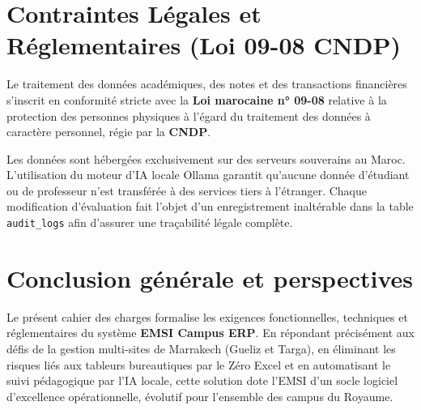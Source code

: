 \documentclass[11pt,a4paper]{report}
\begin{document}
\chapter{Contraintes Légales et Réglementaires (Loi 09-08 CNDP)}

Le traitement des données académiques, des notes et des transactions financières s'inscrit en conformité stricte avec la \textbf{Loi marocaine n° 09-08} relative à la protection des personnes physiques à l'égard du traitement des données à caractère personnel, régie par la \textbf{CNDP}.

Les données sont hébergées exclusivement sur des serveurs souverains au Maroc. L'utilisation du moteur d'IA locale Ollama garantit qu'aucune donnée d'étudiant ou de professeur n'est transférée à des services tiers à l'étranger. Chaque modification d'évaluation fait l'objet d'un enregistrement inaltérable dans la table \texttt{audit\_logs} afin d'assurer une traçabilité légale complète.

\chapter{Conclusion générale et perspectives}

Le présent cahier des charges formalise les exigences fonctionnelles, techniques et réglementaires du système \textbf{EMSI Campus ERP}. En répondant précisément aux défis de la gestion multi-sites de Marrakech (Gueliz et Targa), en éliminant les risques liés aux tableurs bureautiques par le Zéro Excel et en automatisant le suivi pédagogique par l'IA locale, cette solution dote l'EMSI d'un socle logiciel d'excellence opérationnelle, évolutif pour l'ensemble des campus du Royaume.
\end{document}
